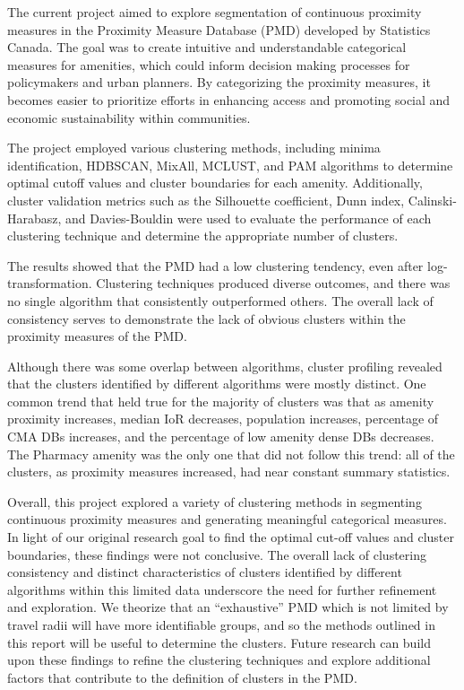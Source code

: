 \documentclass[11pt, a4paper]{article}
\begin{document}
The current project aimed to explore segmentation of continuous proximity measures in the Proximity Measure Database (PMD) developed by Statistics Canada. The goal was to create intuitive and understandable categorical measures for amenities, which could inform decision making processes for policymakers and urban planners. By categorizing the proximity measures, it becomes easier to prioritize efforts in enhancing access and promoting social and economic sustainability within communities.
\par
The project employed various clustering methods, including minima identification, HDBSCAN, MixAll, MCLUST, and PAM algorithms to determine optimal cutoff values and cluster boundaries for each amenity. Additionally, cluster validation metrics such as the Silhouette coefficient, Dunn index, Calinski-Harabasz, and Davies-Bouldin were used to evaluate the performance of each clustering technique and determine the appropriate number of clusters.
\par
The results showed that the PMD had a low clustering tendency, even after log-transformation. Clustering techniques produced diverse outcomes, and there was no single algorithm that consistently outperformed others. The overall lack of consistency serves to demonstrate the lack of obvious clusters within the proximity measures of the PMD.
\par
Although there was some overlap between algorithms, cluster profiling revealed that the clusters identified by different algorithms were mostly distinct. One common trend that held true for the majority of clusters was that as amenity proximity increases, median IoR decreases, population increases, percentage of CMA DBs increases, and the percentage of low amenity dense DBs decreases. The Pharmacy amenity was the only one that did not follow this trend: all of the clusters, as proximity measures increased, had near constant summary statistics.
\par
Overall, this project explored a variety of clustering methods in segmenting continuous proximity measures and generating meaningful categorical measures. In light of our original research goal to find the optimal cut-off values and cluster boundaries, these findings were not conclusive. The overall lack of clustering consistency and distinct characteristics of clusters identified by different algorithms within this limited data underscore the need for further refinement and exploration. We theorize that an ``exhaustive'' PMD which is not limited by travel radii will have more identifiable groups, and so the methods outlined in this report will be useful to determine the clusters. Future research can build upon these findings to refine the clustering techniques and explore additional factors that contribute to the definition of clusters in the PMD.
\end{document}

